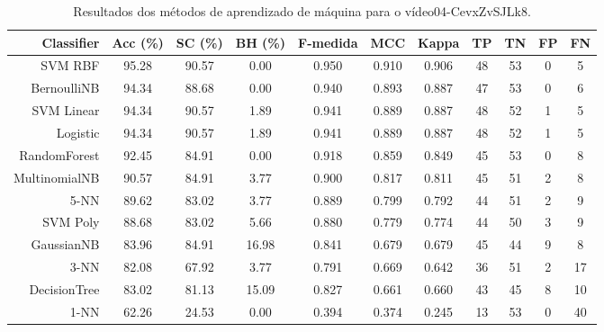 \begin{table}[!htb]
\centering
\caption{Resultados dos métodos de aprendizado de máquina para o vídeo04-CevxZvSJLk8.}
\label{tab:04-CevxZvSJLk8}
\begin{tabular}{r|c|c|c|c|c|c|c|c|c|c}
\hline\hline
Classifier & Acc (\%) & SC (\%) & BH (\%) & F-medida & MCC & Kappa & TP & TN & FP & FN \\ \hline
SVM RBF & 95.28 & 90.57 & 0.00 & 0.950 & 0.910 & 0.906 & 48 & 53 & 0 & 5 \\ 
BernoulliNB & 94.34 & 88.68 & 0.00 & 0.940 & 0.893 & 0.887 & 47 & 53 & 0 & 6 \\ 
SVM Linear & 94.34 & 90.57 & 1.89 & 0.941 & 0.889 & 0.887 & 48 & 52 & 1 & 5 \\ 
Logistic & 94.34 & 90.57 & 1.89 & 0.941 & 0.889 & 0.887 & 48 & 52 & 1 & 5 \\ 
RandomForest & 92.45 & 84.91 & 0.00 & 0.918 & 0.859 & 0.849 & 45 & 53 & 0 & 8 \\ 
MultinomialNB & 90.57 & 84.91 & 3.77 & 0.900 & 0.817 & 0.811 & 45 & 51 & 2 & 8 \\ 
5-NN & 89.62 & 83.02 & 3.77 & 0.889 & 0.799 & 0.792 & 44 & 51 & 2 & 9 \\ 
SVM Poly & 88.68 & 83.02 & 5.66 & 0.880 & 0.779 & 0.774 & 44 & 50 & 3 & 9 \\ 
GaussianNB & 83.96 & 84.91 & 16.98 & 0.841 & 0.679 & 0.679 & 45 & 44 & 9 & 8 \\ 
3-NN & 82.08 & 67.92 & 3.77 & 0.791 & 0.669 & 0.642 & 36 & 51 & 2 & 17 \\ 
DecisionTree & 83.02 & 81.13 & 15.09 & 0.827 & 0.661 & 0.660 & 43 & 45 & 8 & 10 \\ 
1-NN & 62.26 & 24.53 & 0.00 & 0.394 & 0.374 & 0.245 & 13 & 53 & 0 & 40 \\ 
\hline\hline
\end{tabular}
\end{table}
